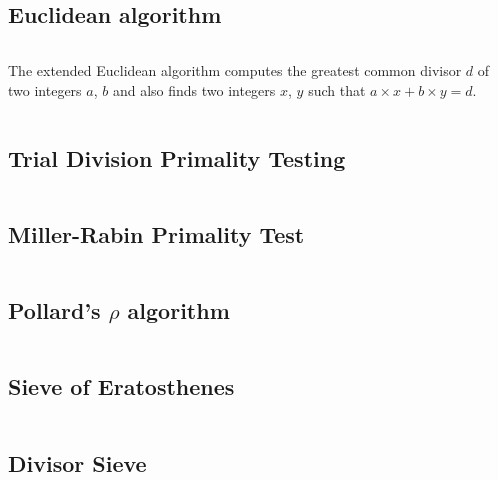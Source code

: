 \documentclass[8pt,a4paper,landscape,oneside]{amsart}
\newcommand{\code}[1]{\inputminted[fontsize=\normalsize,baselinestretch=1]{cpp}{_code/#1}}
\newif\ifverbose
\begin{document}
\begin{multicols*}{3}
    \subsection{Euclidean algorithm}
        \ifverbose
        The Euclidean algorithm computes the greatest common divisor of two
        integers $a$, $b$.
        \fi
        \code{mathematics/gcd.cpp}

        The extended Euclidean algorithm computes the greatest common divisor
        $d$ of two integers $a$, $b$ and also finds two integers $x$, $y$ such
        that $a\times x + b\times y = d$.
        \code{mathematics/egcd.cpp}

    \subsection{Trial Division Primality Testing}
        \ifverbose
        An optimized trial division to check whether an integer is prime.
        \fi
        \code{mathematics/is_prime.cpp}

    \subsection{Miller-Rabin Primality Test}
        \ifverbose
        The Miller-Rabin probabilistic primality test.
        \fi
        \code{mathematics/miller_rabin.cpp}

    \subsection{Pollard's $\rho$ algorithm}
        \code{mathematics/pollard_rho.cpp}

    \subsection{Sieve of Eratosthenes}
        \ifverbose
        An optimized implementation of Eratosthenes' Sieve.
        \fi
        \code{mathematics/prime_sieve.cpp}

    \subsection{Divisor Sieve}
        \ifverbose
        A O(n) prime sieve. Computes the smallest divisor of any number up to n.
        \fi
        \code{mathematics/divisor_sieve.cpp}

    \ifverbose
    \subsection{Modular Exponentiation}
        A function to perform fast modular exponentiation.
        \code{mathematics/mod_pow.cpp}
    \fi


\end{multicols*}
\end{document}
